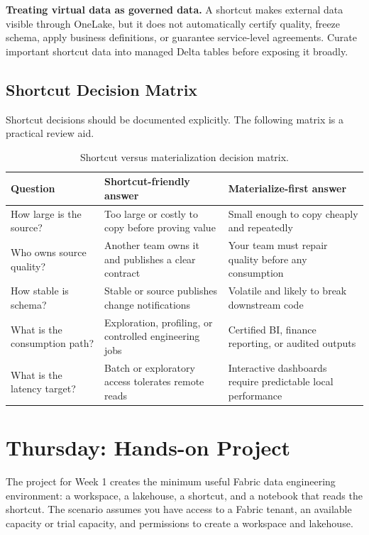 \begin{pitfall}
\textbf{Treating virtual data as governed data.} A shortcut makes external data visible through OneLake, but it does not automatically certify quality, freeze schema, apply business definitions, or guarantee service-level agreements. Curate important shortcut data into managed Delta tables before exposing it broadly.
\end{pitfall}

\subsection{Shortcut Decision Matrix}
Shortcut decisions should be documented explicitly. The following matrix is a practical review aid.

\begin{table}[H]
\centering
\small
\begin{tabular}{@{}p{4.0cm}p{4.5cm}p{4.5cm}@{}}
\toprule
\textbf{Question} & \textbf{Shortcut-friendly answer} & \textbf{Materialize-first answer} \\
\midrule
How large is the source? & Too large or costly to copy before proving value & Small enough to copy cheaply and repeatedly \\
Who owns source quality? & Another team owns it and publishes a clear contract & Your team must repair quality before any consumption \\
How stable is schema? & Stable or source publishes change notifications & Volatile and likely to break downstream code \\
What is the consumption path? & Exploration, profiling, or controlled engineering jobs & Certified BI, finance reporting, or audited outputs \\
What is the latency target? & Batch or exploratory access tolerates remote reads & Interactive dashboards require predictable local performance \\
\bottomrule
\end{tabular}
\caption{Shortcut versus materialization decision matrix.}
\label{tab:chapter1-shortcut-matrix}
\end{table}

\section{Thursday: Hands-on Project}
The project for Week 1 creates the minimum useful Fabric data engineering environment: a workspace, a lakehouse, a shortcut, and a notebook that reads the shortcut. The scenario assumes you have access to a Fabric tenant, an available capacity or trial capacity, and permissions to create a workspace and lakehouse.

